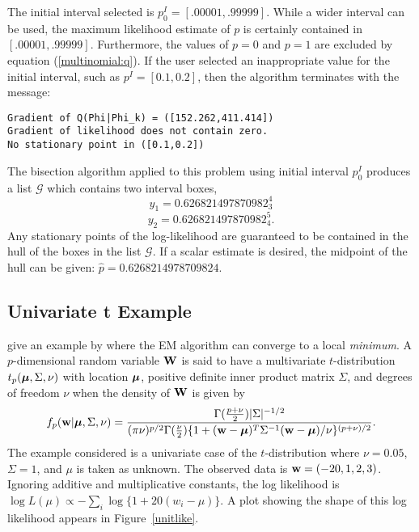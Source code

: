 The initial interval selected
is $p_0^I = [.00001,.99999]$.  While a wider interval can
be used, the maximum
likelihood estimate of $p$ is certainly contained in $[.00001,.99999]$.
Furthermore, the values of $p=0$ and $p=1$ are excluded by equation
(\ref{multinomial:q}).  If the user selected an inappropriate value 
for the initial
interval, such as  
$p^I=[0.1,0.2]$, then the algorithm terminates with the message:
\begin{verbatim}
Gradient of Q(Phi|Phi_k) = ([152.262,411.414])
Gradient of likelihood does not contain zero.
No stationary point in ([0.1,0.2])
\end{verbatim}

The bisection algorithm applied to this problem using initial interval $p_0^I$
produces a list
$\mathcal{G}$ which contains two interval boxes,
$$y_1 = 0.626821497870982_3^4$$
$$y_2 = 0.626821497870982_4^5.$$
Any stationary points of the log-likelihood are guaranteed to be
contained in the hull of the boxes in the list $\mathcal{G}$.  If a
scalar estimate is desired, the midpoint of the hull can be given:
$\hat{p} = 0.6268214978709824$.

\subsection{Univariate t Example}
\cite{McLachlan:Book} give an example by \cite{Arslan} where the EM algorithm
can converge to a local {\it minimum}.  
A $p$-dimensional random variable ${\bf W}$ is 
said to have a multivariate $t$-distribution $t_p(\mbox{\boldmath $\mu$}, \Sigma, \nu)$ with
location $\mbox{\boldmath $\mu$}$, positive definite inner product matrix $\Sigma$, and degrees
of freedom $\nu$ when the density of ${\bf W}$ is given by
\begin{equation}
f_p({\bf w} | \mbox{\boldmath $\mu$}, \Sigma, \nu) = \frac{\Gamma(\frac{p+\nu}{2})|\Sigma|^{-1/2}}
  {(\pi \nu)^{p/2} \Gamma(\frac{\nu}{2}) 
  \{ 1 + ({\bf w}-\mbox{\boldmath $\mu$})^T\Sigma^{-1}({\bf w}-\mbox{\boldmath $\mu$}) / \nu\}^{(p+\nu)/2}}.
\end{equation}
The example considered is a univariate case of the $t$-distribution where
$\nu=0.05$, $\Sigma=1$, and $\mu$ is taken as unknown.  The observed data is
${\bf w}=(-20,1,2,3)$.  Ignoring additive and multiplicative constants, the log
likelihood is
$\log L(\mu) \propto -\sum_i \log \{1+20(w_i - \mu)\}$.  A plot showing the
shape of this log
likelihood appears in Figure~\ref{unitlike}.

